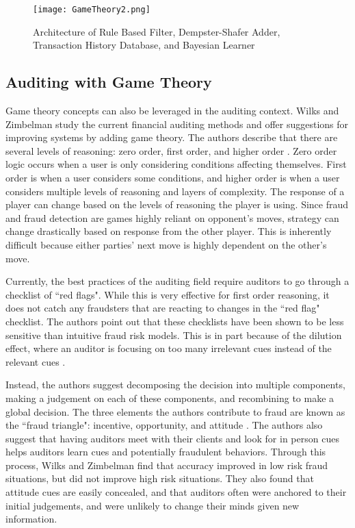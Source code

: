 \documentclass[midd]{thesis}
\begin{document}
\begin{figure} \centering
  \texttt{[image: GameTheory2.png]}
  \caption{Architecture of Rule Based Filter, Dempster-Shafer Adder, Transaction History Database, and Bayesian Learner}
  \label{fig:gametheory2}
\end{figure}


\subsection{Auditing with Game Theory}

Game theory concepts can also be leveraged in the auditing context. Wilks and Zimbelman study the current financial auditing methods and offer suggestions for improving systems by adding game theory. The authors describe that there are several levels of reasoning: zero order, first order, and higher order \cite{Wilks2004}. Zero order logic occurs when a user is only considering conditions affecting themselves. First order is when a user considers some conditions, and higher order is when a user considers multiple levels of reasoning and layers of complexity. The response of a player can change based on the levels of reasoning the player is using. Since fraud and fraud detection are games highly reliant on opponent's moves, strategy can change drastically based on response from the other player. This is inherently difficult because either parties' next move is highly dependent on the other's move. 

Currently, the best practices of the auditing field require auditors to go through a checklist of ``red flags". While this is very effective for first order reasoning, it does not catch any fraudsters that are reacting to changes in the ``red flag" checklist. The authors point out that these checklists have been shown to be less sensitive than intuitive fraud risk models. This is in part because of the dilution effect, where an auditor is focusing on too many irrelevant cues instead of the relevant cues \cite{Wilks2004}. 

Instead, the authors suggest decomposing the decision into multiple components, making a judgement on each of these components, and recombining to make a global decision. The three elements the authors contribute to fraud are known as the ``fraud triangle": incentive, opportunity, and attitude \cite{Wilks2004}. The authors also suggest that having auditors meet with their clients and look for in person cues helps auditors learn cues and potentially fraudulent behaviors. Through this process, Wilks and Zimbelman find that accuracy improved in low risk fraud situations, but did not improve high risk situations. They also found that attitude cues are easily concealed, and that auditors often were anchored to their initial judgements, and were unlikely to change their minds given new information.
\end{document}
